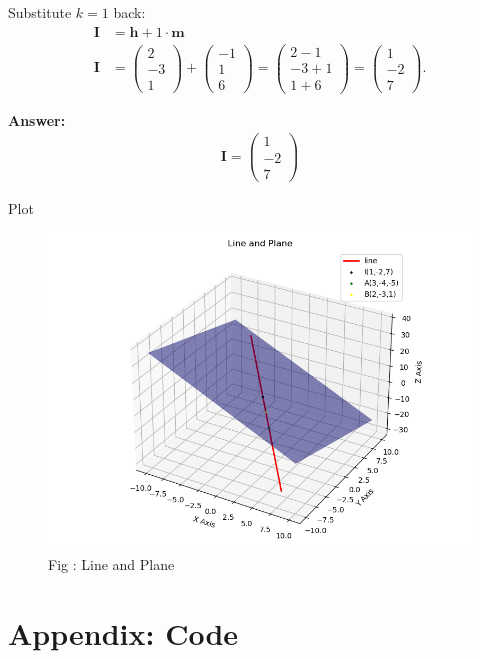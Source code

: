 \documentclass{beamer}
\numberwithin{equation}{section}
\theoremstyle{remark}
\newcommand{\myvec}[1]{\ensuremath{\begin{pmatrix}#1\end{pmatrix}}}
\let\vec\mathbf
\begin{document}
\begin{frame}

Substitute $k=1$ back:
\begin{align}
\vec{I} &= \vec{h}+1\cdot \vec{m} \\
\vec{I} &= \myvec{2\\-3\\1} + \myvec{-1\\1\\6} = \myvec{2-1\\-3+1\\1+6} = \myvec{1\\-2\\7}.
\end{align}

\textbf{Answer:}
\begin{align}
\vec{I} = \myvec{1\\-2\\7}
\end{align}
  
\end{frame} 

\begin{frame}{Plot}

\begin{figure}[h!]
  \centering
  \includegraphics[width=0.8\columnwidth]{figs/intersection.png} 
   \caption*{Fig : Line and Plane}
  \label{Fig1}
\end{figure}

\end{frame}

\section*{Appendix: Code}
\end{document}

